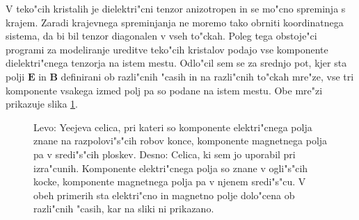 \documentclass[a4paper,10pt]{article}
\renewcommand{\vec}{\mathbf}
\newcommand{\E}{\vec E}
\newcommand{\B}{\vec B}
\begin{document}
V teko"cih kristalih je dielektri"cni tenzor anizotropen in se mo"cno spreminja s krajem. 
Zaradi krajevnega spreminjanja ne moremo tako obrniti koordinatnega sistema, da bi bil tenzor diagonalen v vseh to"ckah. 
Poleg tega obstoje"ci programi za modeliranje ureditve teko"cih kristalov podajo vse komponente dielektri"cnega tenzorja na istem mestu\cite{ravnik-zumer-ldg}.
Odlo"cil sem se za srednjo pot, kjer sta polji $\E$ in $\B$ definirani ob razli"cnih "casih in na razli"cnih to"ckah mre"ze, vse tri komponente vsakega izmed polj pa so podane na istem mestu. 
Obe mre"zi prikazuje slika \ref{fig:lattice}. 

\begin{figure}[h]
\centering
\caption{Levo: Yeejeva celica, pri kateri so komponente elektri"cnega polja znane na razpolovi"s"cih robov konce, komponente magnetnega polja pa v sredi"s"cih ploskev\cite{yee-lattice}. Desno: Celica, ki sem jo uporabil pri izra"cunih. Komponente elektri"cnega polja so znane v ogli"s"cih kocke, komponente magnetnega polja pa v njenem sredi"s"cu. V obeh primerih sta elektri"cno in magnetno polje dolo"cena ob razli"cnih "casih, kar na sliki ni prikazano.}
\label{fig:lattice}
\end{figure}
\end{document}
